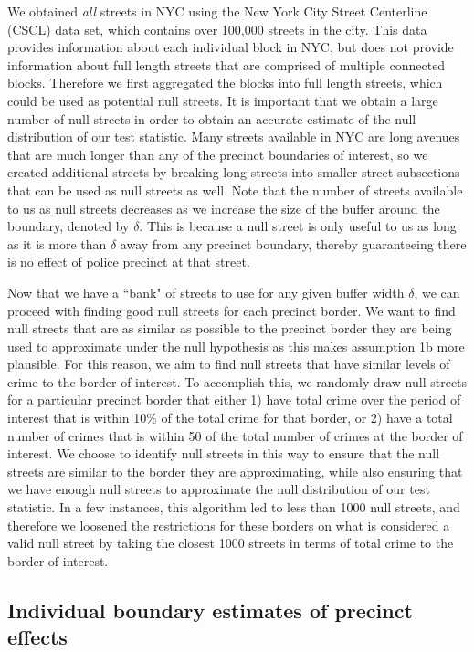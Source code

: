 \documentclass[a4paper,11pt]{article}
\begin{document}
We obtained \textit{all} streets in NYC using the New York City Street Centerline (CSCL) data set, which contains over 100,000 streets in the city. This data provides information about each individual block in NYC, but does not provide information about full length streets that are comprised of multiple connected blocks. Therefore we first aggregated the blocks into full length streets, which could be used as potential null streets. It is important that we obtain a large number of null streets in order to obtain an accurate estimate of the null distribution of our test statistic. Many streets available in NYC are long avenues that are much longer than any of the precinct boundaries of interest, so we created additional streets by breaking long streets into smaller street subsections that can be used as null streets as well. Note that the number of streets available to us as null streets decreases as we increase the size of the buffer around the boundary, denoted by $\delta$. This is because a null street is only useful to us as long as it is more than $\delta$ away from any precinct boundary, thereby guaranteeing there is no effect of police precinct at that street. 

Now that we have a ``bank" of streets to use for any given buffer width $\delta$, we can proceed with finding good null streets for each precinct border. We want to find null streets that are as similar as possible to the precinct border they are being used to approximate under the null hypothesis as this makes assumption 1b more plausible. For this reason, we aim to find null streets that have similar levels of crime to the border of interest. To accomplish this, we randomly draw null streets for a particular precinct border that either 1) have total crime over the period of interest that is within 10\% of the total crime for that border, or 2) have a total number of crimes that is within 50 of the total number of crimes at the border of interest. We choose to identify null streets in this way to ensure that the null streets are similar to the border they are approximating, while also ensuring that we have enough null streets to approximate the null distribution of our test statistic. In a few instances, this algorithm led to less than 1000 null streets, and therefore we loosened the restrictions for these borders on what is considered a valid null street by taking the closest 1000 streets in terms of total crime to the border of interest. 

\subsection{Individual boundary estimates of precinct effects}
\end{document}
